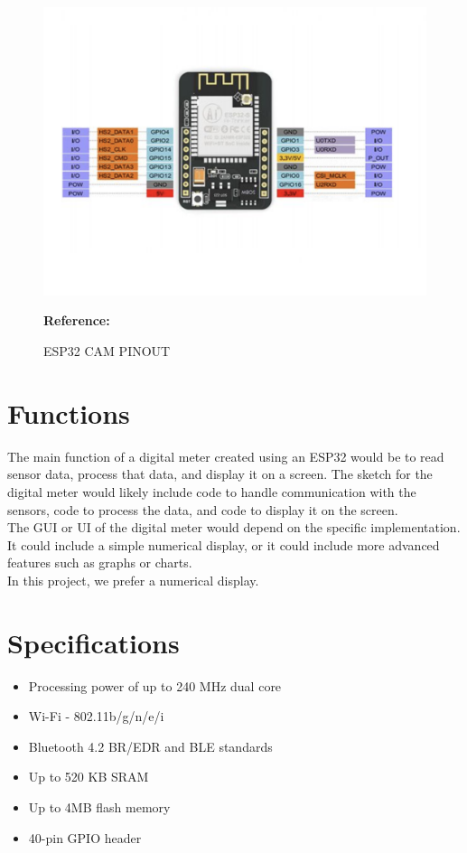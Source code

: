 \begin{figure}  [H]
	\begin{center}
		\includegraphics[width=12cm]{Chapters/ESP32CAMpinout}
		\caption{ESP32 CAM PINOUT} 
		\label{fig:Components in ESP32 Cam}
		\footnotesize \textbf{Reference:} \autocite{randomnerdtutorials}
	\end{center}
\end{figure}

	
\section{Functions}
	The main function of a digital meter created using an ESP32 would be to read sensor data, process that data, and display it on a screen. The sketch for the digital meter would likely include code to handle communication with the sensors, code to process the data, and code to display it on the screen.\\
	
	The GUI or UI of the digital meter would depend on the specific implementation. It could include a simple numerical display, or it could include more advanced features such as graphs or charts.\\
	
	In this project, we prefer a numerical display.\\
	
\section{Specifications}

\begin{itemize}
	\item Processing power of up to 240 MHz dual core
	\item Wi-Fi - 802.11b/g/n/e/i
	\item Bluetooth 4.2 BR/EDR and BLE standards
	\item Up to 520 KB SRAM
	\item Up to 4MB flash memory
	\item 40-pin GPIO header
\end{itemize}

